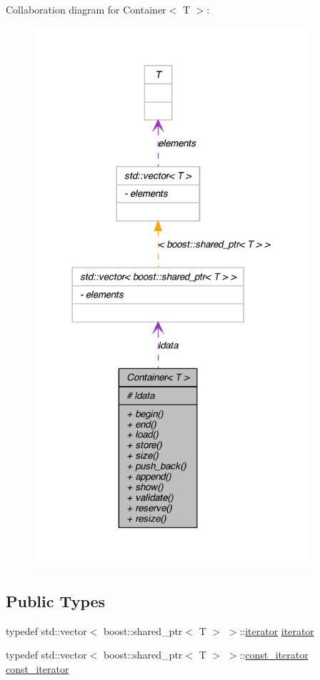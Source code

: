 Collaboration diagram for Container$<$ T $>$:
\nopagebreak
\begin{figure}[H]
\begin{center}
\leavevmode
\includegraphics[width=288pt]{class_container__coll__graph}
\end{center}
\end{figure}
\subsection*{Public Types}
\begin{DoxyCompactItemize}
\item 
typedef std::vector$<$ boost::shared\_\-ptr$<$ T $>$ $>$::\hyperlink{class_container_afe880028d8304353129f47cd1d28c20a}{iterator} \hyperlink{class_container_afe880028d8304353129f47cd1d28c20a}{iterator}
\item 
typedef std::vector$<$ boost::shared\_\-ptr$<$ T $>$ $>$::\hyperlink{class_container_a5eabadaffdd508cb623c955eb0af1518}{const\_\-iterator} \hyperlink{class_container_a5eabadaffdd508cb623c955eb0af1518}{const\_\-iterator}
\end{DoxyCompactItemize}
